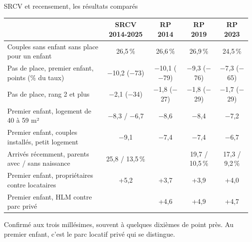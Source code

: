 \documentclass[10pt,aspectratio=169]{beamer}
\begin{document}
\begin{frame}{SRCV et recensement, les résultats comparés}
  \centering\scriptsize
  \setlength{\tabcolsep}{4pt}
  \begin{tabular}{@{}lcccc@{}}
    \toprule
    & SRCV 2014-2025 & RP 2014 & RP 2019 & RP 2023 \\
    \midrule
    Couples sans enfant sans place pour un enfant & 26,5\,\% & 26,6\,\% & 26,9\,\% & 24,5\,\% \\
    Pas de place, premier enfant, points (\% du taux) & $-$10,2 ($-$73) & $-$10,1 ($-$79) & $-$9,3 ($-$76) & $-$7,3 ($-$65) \\
    Pas de place, rang 2 et plus & $-$2,1 ($-$34) & $-$1,8 ($-$27) & $-$1,8 ($-$29) & $-$1,7 ($-$29) \\
    Premier enfant, logement de 40 à 59 m² & $-$8,3 / $-$6,7 & $-$8,6 & $-$8,4 & $-$7,2 \\
    Premier enfant, couples installés, petit logement & $-$9,1 & $-$7,4 & $-$7,4 & $-$6,7 \\
    Arrivés récemment, parents avec / sans naissance & 25,8 / 13,5\,\% & & 19,7 / 10,5\,\% & 17,3 / 9,2\,\% \\
    Premier enfant, propriétaires contre locataires & +5,2 & +3,7 & +3,9 & +4,0 \\
    Premier enfant, HLM contre parc privé & & +4,6 & +4,9 & +4,7 \\
    \bottomrule
  \end{tabular}
  \vspace{0.2cm}

  \raggedright\small
  Confirmé aux trois millésimes, souvent à quelques dixièmes de point près. Au premier enfant, c'est le parc locatif privé qui se distingue.
\end{frame}
\end{document}
